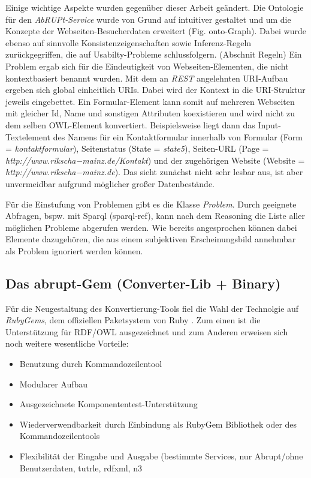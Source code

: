 \documentclass[runningheads,a4paper]{llncs}
\begin{document}
Einige wichtige Aspekte wurden gegenüber dieser Arbeit geändert. 
Die Ontologie für den \textit{AbRUPt-Service} wurde von Grund auf intuitiver gestaltet und um die Konzepte der Webseiten-Besucherdaten erweitert (Fig. onto-Graph). 
Dabei wurde ebenso auf sinnvolle Konsistenzeigenschaften sowie Inferenz-Regeln zurückgegriffen, die auf Usabilty-Probleme schlussfolgern. (Abschnit Regeln)
Ein Problem ergab sich für die Eindeutigkeit von Webseiten-Elementen, die nicht kontextbasiert benannt wurden. 
Mit dem an \textit{REST} angelehnten URI-Aufbau ergeben sich global einheitlich URIs.
Dabei wird der Kontext in die URI-Struktur jeweils eingebettet. 
Ein Formular-Element kann somit auf mehreren Webseiten mit gleicher Id, Name und sonstigen Attributen koexistieren und wird nicht zu dem selben OWL-Element konvertiert. 
Beispielsweise liegt dann das Input-Textelement des Namens für ein Kontaktformular innerhalb von Formular (Form = \textit{kontaktformular}), Seitenstatus (State = \textit{state5}), Seiten-URL (Page = \textit{http://www.rikscha−mainz.de/Kontakt}) und der zugehörigen Website (Website = \textit{http://www.rikscha−mainz.de}).
Das sieht zunächst nicht sehr lesbar aus, ist aber unvermeidbar aufgrund möglicher großer Datenbestände. 

 
Für die Einstufung von Problemen gibt es die Klasse \textit{Problem}. 
Durch geeignete Abfragen, bspw. mit Sparql (sparql-ref), kann nach dem Reasoning die Liste aller möglichen Probleme abgerufen werden. 
Wie bereits angesprochen können dabei Elemente dazugehören, die aus einem subjektiven Erscheinungsbild annehmbar als Problem ignoriert werden können.

\subsection{Das abrupt-Gem (Converter-Lib + Binary)}
Für die Neugestaltung des Konvertierung-Tools fiel die Wahl der Technolgie auf \textit{RubyGems}, dem offiziellen Paketsystem von Ruby . 
Zum einen ist die Unterstützung \cite{ruby-rdf} für RDF/OWL ausgezeichnet und zum Anderen erweisen sich noch weitere wesentliche Vorteile:
\begin{itemize}
\item{Benutzung durch Kommandozeilentool}
\item{Modularer Aufbau}
\item{Ausgezeichnete Komponententest-Unterstützung}
\item{Wiederverwendbarkeit durch Einbindung als RubyGem Bibliothek oder des Kommandozeilentools}
\item{Flexibilität der Eingabe und Ausgabe (bestimmte Services, nur Abrupt/ohne Benutzerdaten, tutrle, rdfxml, n3}
\end{itemize}
\end{document}
